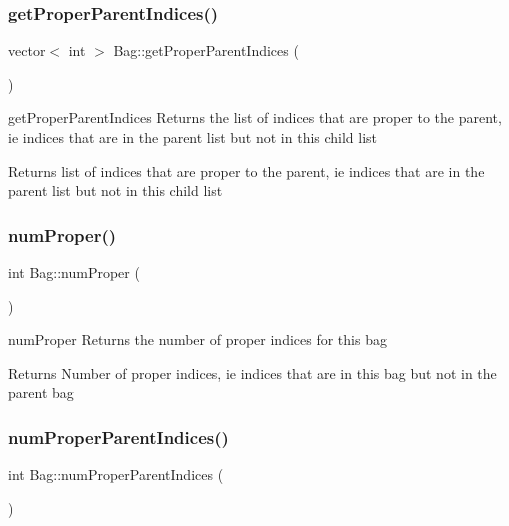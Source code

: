 \subsubsection{\texorpdfstring{get\+Proper\+Parent\+Indices()}{getProperParentIndices()}}
{\footnotesize\ttfamily vector$<$ int $>$ Bag\+::get\+Proper\+Parent\+Indices (\begin{DoxyParamCaption}{ }\end{DoxyParamCaption})}



get\+Proper\+Parent\+Indices Returns the list of indices that are proper to the parent, ie indices that are in the parent list but not in this child list 

\begin{DoxyReturn}{Returns}
list of indices that are proper to the parent, ie indices that are in the parent list but not in this child list 
\end{DoxyReturn}
\mbox{\label{class_bag_a03b31223756e1f3d7c040a72e53597d7}} 
\subsubsection{\texorpdfstring{num\+Proper()}{numProper()}}
{\footnotesize\ttfamily int Bag\+::num\+Proper (\begin{DoxyParamCaption}{ }\end{DoxyParamCaption})}



num\+Proper Returns the number of proper indices for this bag 

\begin{DoxyReturn}{Returns}
Number of proper indices, ie indices that are in this bag but not in the parent bag 
\end{DoxyReturn}
\mbox{\label{class_bag_adb324085144f4ea2d1e5d0cfc008c591}} 
\subsubsection{\texorpdfstring{num\+Proper\+Parent\+Indices()}{numProperParentIndices()}}
{\footnotesize\ttfamily int Bag\+::num\+Proper\+Parent\+Indices (\begin{DoxyParamCaption}{ }\end{DoxyParamCaption})}



